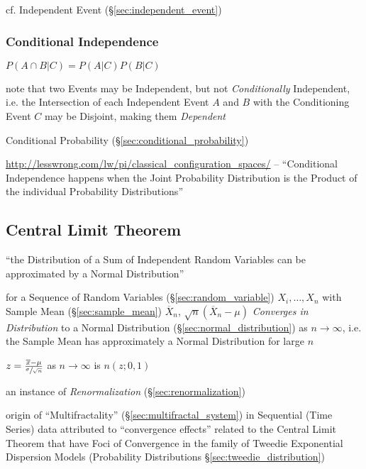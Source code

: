 \fist cf. Independent Event (\S\ref{sec:independent_event})



\subsubsection{Conditional Independence}\label{sec:conditional_independence}

$P(A \cap B | C) = P(A|C)P(B|C)$

note that two Events may be Independent, but not \emph{Conditionally}
Independent, i.e. the Intersection of each Independent Event $A$ and $B$ with
the Conditioning Event $C$ may be Disjoint, making them \emph{Dependent}

\fist Conditional Probability (\S\ref{sec:conditional_probability})

\url{http://lesswrong.com/lw/pi/classical_configuration_spaces/}
-- ``Conditional Independence happens when the Joint Probability Distribution
is the Product of the individual Probability Distributions''



\subsection{Central Limit Theorem}\label{sec:central_limit}

``the Distribution of a Sum of Independent Random Variables can be approximated
by a Normal Distribution''

for a Sequence of Random Variables (\S\ref{sec:random_variable})
$X_i, \ldots, X_n$ with Sample Mean (\S\ref{sec:sample_mean})
$\overline{X}_n$, $\sqrt{n}(\overline{X}_n - \mu)$
\emph{Converges in Distribution} to a Normal Distribution
(\S\ref{sec:normal_distribution}) as $n \rightarrow \infty$, i.e. the Sample
Mean has approximately a Normal Distribution for large $n$

$z = \frac{\overline{x} - \mu}{\sfrac{\sigma}{\sqrt{n}}}$ as
$n \rightarrow \infty$ is $n(z; 0,1)$ %

\fist an instance of \emph{Renormalization} (\S\ref{sec:renormalization})

\fist origin of ``Multifractality'' (\S\ref{sec:multifractal_system}) in
Sequential (Time Series) data attributed to ``convergence effects'' related to
the Central Limit Theorem that have Foci of Convergence in the family of Tweedie
Exponential Dispersion Models (Probability Distributions
\S\ref{sec:tweedie_distribution})

